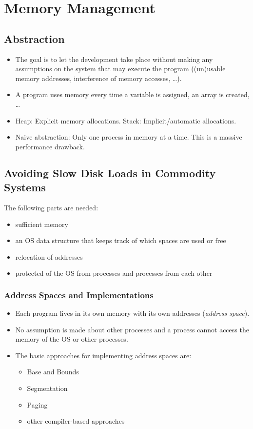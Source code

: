 
\chapter{Memory Management}
	\section{Abstraction}
		\begin{itemize}
			\item The goal is to let the development take place without making any assumptions on the system that may execute the program ((un)usable memory addresses, interference of memory accesses, \dots).
			\item A program uses memory every time a variable is assigned, an array is created, \dots
			\item Heap: Explicit memory allocations. Stack: Implicit/automatic allocations.
			\item Naive abstraction: Only one process in memory at a time. This is a massive performance drawback.
		\end{itemize}

	\section{Avoiding Slow Disk Loads in Commodity Systems}
		The following parts are needed:
		\begin{itemize}
			\item sufficient memory
			\item an OS data structure that keeps track of which spaces are used or free
			\item relocation of addresses
			\item protected of the OS from processes and processes from each other
		\end{itemize}


		\subsection{Address Spaces and Implementations}
			\begin{itemize}
				\item Each program lives in its own memory with its own addresses (\textit{address space}).
				\item No assumption is made about other processes and a process cannot access the memory of the OS or other processes.
				\item The basic approaches for implementing address spaces are:
					\begin{itemize}
						\item Base and Bounds
						\item Segmentation
						\item Paging
						\item other compiler-based approaches
					\end{itemize}
			\end{itemize}


